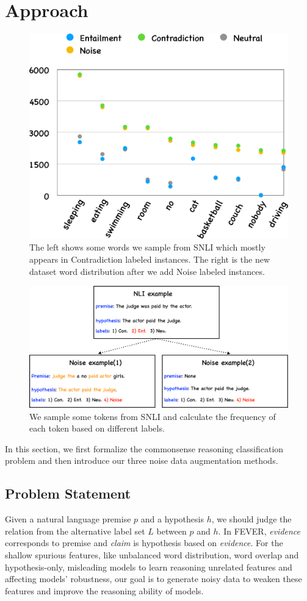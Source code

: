 \section{Approach}
\label{sec:approach}

\begin{figure}[th!]
	\centering
	\includegraphics[width=0.4\columnwidth]{figures/noise_balance.eps}
	\caption{The left shows some words we sample from SNLI which mostly appears in Contradiction labeled instances. The right is the new dataset word distribution after we add Noise labeled instances.}
\label{fig:noise_balance}
\end{figure}

\begin{figure}[th!]
	\centering
	\includegraphics[width=0.8\columnwidth]{figures/noise.eps}
	\caption{We sample some tokens from SNLI and calculate the frequency of each token based on different labels.}
\label{fig:noise2and3}
\end{figure}

In this section, we first formalize the commonsense reasoning classification problem
 and then introduce our three noise data augmentation methods.
 
\subsection{Problem Statement}
\label{sec:problem_statement}
Given a natural language
premise $p$ and a hypothesis $h$, we should judge the 
relation  from the alternative label set $L$ between $p$ and $h$. 
In FEVER, \textit{evidence} corresponds to premise and \textit{claim} 
is hypothesis based on \textit{evidence}. For the shallow spurious features, like 
unbalanced word distribution, word overlap and hypothesis-only, misleading models to
learn reasoning unrelated features and affecting models' robustness, 
our goal is to generate noisy data to weaken these features and improve 
the reasoning ability of models.


